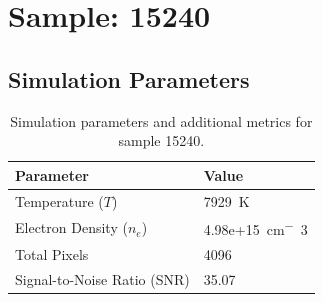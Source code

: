 \documentclass[a4paper,11pt]{article}
\begin{document}
\clearpage

\section{Sample: 15240}
\subsection{Simulation Parameters}
\begin{table}[h!]
    \centering
    \begin{tabular}{ll}
        \toprule
        \textbf{Parameter} & \textbf{Value} \\
        \midrule
        Temperature ($T$) & 7929 \,\si{K} \\
        Electron Density ($n_e$) & 4.98e+15 \,\si{cm^-3} \\
        Total Pixels & 4096 \\
        Signal-to-Noise Ratio (SNR) & 35.07 \\
        \bottomrule
    \end{tabular}
    \caption{Simulation parameters and additional metrics for sample 15240.}
    \label{tab:params_15240}
\end{table}
\end{document}
